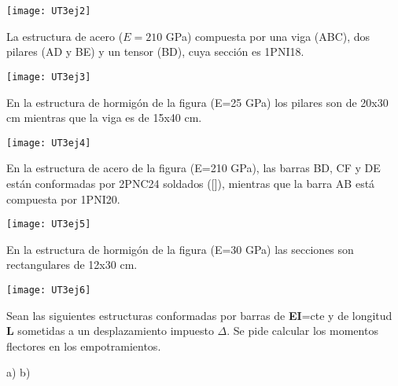 \begin{center}
	\texttt{[image: UT3ej2]}
\end{center}


\ejercicio

La estructura de acero ($E=210$ GPa) compuesta por una viga (ABC), dos pilares (AD y BE) y un tensor (BD), cuya sección es 1PNI18.

\begin{center}
	\texttt{[image: UT3ej3]}
\end{center}

\ejercicio

En la estructura de hormigón de la figura (E=25 GPa) los pilares son de 20x30 cm mientras que la viga es de 15x40 cm. 

\begin{center}
	\texttt{[image: UT3ej4]}
\end{center}


\ejercicio

En la estructura de acero de la figura (E=210 GPa), las barras BD, CF y DE están conformadas por 2PNC24 soldados ([]), mientras que la barra AB está compuesta por 1PNI20. 


\begin{center}
	\texttt{[image: UT3ej5]}
\end{center}



\ejercicio 

En la estructura de hormigón de la figura (E=30 GPa) las secciones son rectangulares de 12x30 cm. 

\begin{center}
	\texttt{[image: UT3ej6]}
\end{center}


\ejercicio


Sean las siguientes estructuras conformadas por barras de \textbf{EI}=cte y de longitud \textbf{L} sometidas a un desplazamiento impuesto $\Delta$. Se pide calcular los momentos flectores en los empotramientos.


\begin{center}
	\def\svgwidth{0.45\textwidth}
	a) 
	\def\svgwidth{0.45\textwidth}
	b) 
\end{center}
